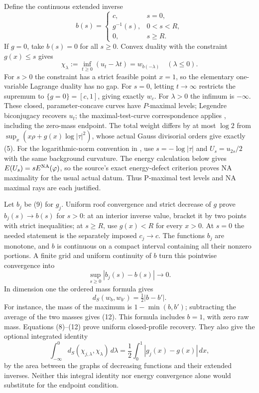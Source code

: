 \documentclass[11pt]{article}
\begin{document}
Define the continuous extended inverse
\[
 b(s)=\begin{cases}
 c,&s=0,\\
 g^{-1}(s),&0<s<R,\\
 0,&s\ge R.
 \end{cases}                                            \tag{9}
\]
If $g=0$, take $b(s)=0$ for all $s\ge0$.
Convex duality with the constraint $g(x)\le s$ gives
\[
 \chi_\lambda:=\inf_{t\ge0}(u_t-\lambda t)
                  =w_{b(-\lambda)}\quad (\lambda\le0). \tag{10}
\]
For $s>0$ the constraint has a strict feasible point $x=1$, so
the elementary one-variable Lagrange duality has no gap.
For $s=0$, letting $t\to\infty$ restricts the supremum to
$\{g=0\}=[c,1]$, giving exactly $w_c$.
For $\lambda>0$ the infimum is $-\infty$.
These closed, parameter-concave curves have $P$-maximal levels;
Legendre biconjugacy recovers $u_t$; the maximal-test-curve
correspondence applies \cite{levels}, including the zero-mass endpoint.
The total weight differs by at most $\log2$ from
$\sup_x(x\rho+g(x)\log|\tau|^2)$, whose actual Gauss divisorial
orders give exactly (5). For the logarithmic-norm convention in
\cite{maximal}, use $s=-\log|\tau|$ and $U_s=u_{2s}/2$ with the
same background curvature. The energy calculation below gives
$E(U_s)=sE^{\rm NA}(\varphi)$, so the source's exact energy-defect
criterion proves NA maximality for the usual actual datum. Thus
P-maximal test levels and NA maximal rays are each justified.

Let $b_j$ be (9) for $g_j$. Uniform roof convergence and strict
decrease of $g$ prove $b_j(s)\to b(s)$ for $s>0$: at an interior
inverse value, bracket it by two points with strict inequalities;
at $s\ge R$, use $g(x)<R$ for every $x>0$.
At $s=0$ the needed statement is the separately imposed
$c_j\to c$. The functions $b_j$ are monotone, and $b$ is continuous
on a compact interval containing all their nonzero portions.
A finite grid and uniform continuity of $b$ turn this pointwise
convergence into
\[
 \sup_{s\ge0}|b_j(s)-b(s)|\longrightarrow0.              \tag{11}
\]
In dimension one the ordered mass formula gives
\[
 d_S(w_b,w_{b'})=\tfrac12|b-b'|.                         \tag{12}
\]
For instance, the mass of the maximum is $1-\min(b,b')$;
subtracting the average of the two masses gives (12).
This formula includes $b=1$, with zero raw mass.
Equations (8)--(12) prove uniform closed-profile recovery.
They also give the optional integrated identity
\[
 \int_{-\infty}^0 d_S(\chi_{j,\lambda},\chi_\lambda)\,d\lambda
 =\frac12\int_0^1|g_j(x)-g(x)|\,dx,
\]
by the area between the graphs of decreasing functions and their
extended inverses. Neither this integral identity nor energy
convergence alone would substitute for the endpoint condition.
\end{document}
